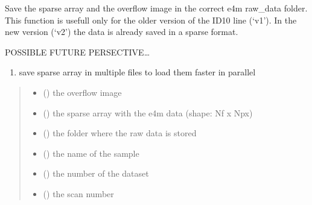 \documentclass[letterpaper,10pt,english]{sphinxmanual}
\begin{document}
\begin{fulllineitems}
\label{\detokenize{index:ID10_tools.save_sparse_e4m_v1}}
\pysigstartsignatures
\pysiglinewithargsret
{}
{\sphinxparamcomma {}\sphinxparamcomma {}\sphinxparamcomma {}\sphinxparamcomma {}\sphinxparamcomma {}}
{}
\pysigstopsignatures
\sphinxAtStartPar
Save the sparse array and the overflow image in the correct e4m raw\_data folder. This function is usefull only for the older version of the ID10 line (‘v1’). In the new version (‘v2’) the data is already saved in a sparse format.

\sphinxAtStartPar
POSSIBLE FUTURE PERSECTIVE…
\begin{enumerate}
%
\item {} 
\sphinxAtStartPar
save sparse array in multiple files to load them faster in parallel

\end{enumerate}
\begin{quote}\begin{description}
\begin{itemize}
\item {} 
\sphinxAtStartPar
{} () \textendash{} the overflow image

\item {} 
\sphinxAtStartPar
{} () \textendash{} the sparse array with the e4m data (shape: Nf x Npx)

\item {} 
\sphinxAtStartPar
{} () \textendash{} the folder where the raw data is stored

\item {} 
\sphinxAtStartPar
{} () \textendash{} the name of the sample

\item {} 
\sphinxAtStartPar
{} () \textendash{} the number of the dataset

\item {} 
\sphinxAtStartPar
{} () \textendash{} the scan number

\end{itemize}

\end{description}\end{quote}

\end{fulllineitems}
\end{document}
